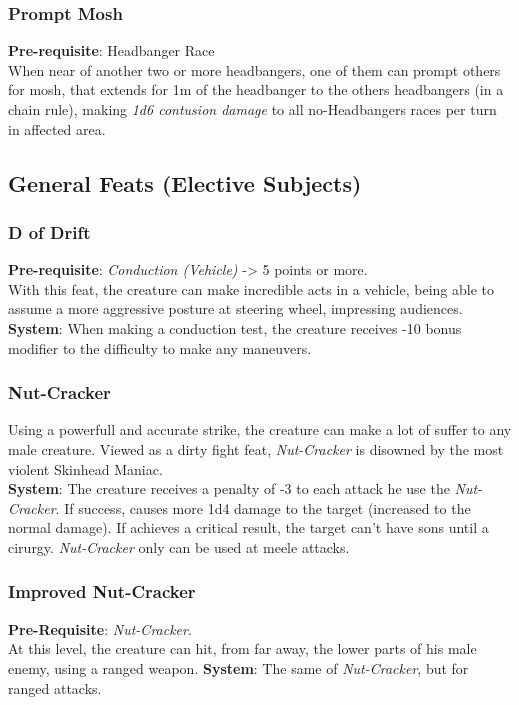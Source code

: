 \documentclass[ letterpaper,12pt]{article}
\begin{document}
\subsubsection{Prompt Mosh}
 {\bf Pre-requisite}: Headbanger Race\\
 When near of another two or more headbangers, one of them can prompt others for mosh, that extends for 1m of the headbanger to the others headbangers (in a chain rule), making {\it 1d6 contusion damage} to all no-Headbangers races per turn in affected area.

\subsection{General Feats (Elective Subjects)}

\subsubsection{D of Drift}
{\bf Pre-requisite}: {\it Conduction (Vehicle)} -> 5 points or more.\\
With this feat, the creature can make incredible acts in a vehicle, being able to assume a more aggressive posture at steering wheel, impressing audiences.\\
{\bf System}: When making a conduction test, the creature receives -10 bonus modifier to the difficulty to make any maneuvers.

\subsubsection{Nut-Cracker}
Using a powerfull and accurate strike, the creature can make a lot of suffer to any male creature. Viewed as a dirty fight feat, {\it Nut-Cracker} is disowned by the most violent Skinhead Maniac.\\
{\bf System}: The creature receives a penalty of -3 to each attack he use the {\it Nut-Cracker}. If success, causes more 1d4 damage to the target (increased to the normal damage). If achieves a critical result, the target can't have sons until a cirurgy. {\it Nut-Cracker} only can be used at meele attacks.

\subsubsection{Improved Nut-Cracker}
{\bf Pre-Requisite}: {\it Nut-Cracker}.\\
At this level, the creature can hit, from far away, the lower parts of his male enemy, using a ranged weapon.
{\bf System}: The same of {\it Nut-Cracker}, but for ranged attacks.
\end{document}

